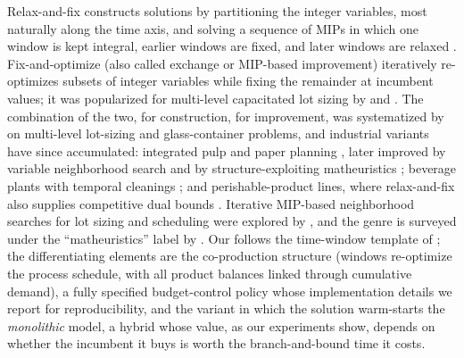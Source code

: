 Relax-and-fix constructs solutions by partitioning the integer
variables, most naturally along the time axis, and solving a
sequence of MIPs in which one window is kept integral, earlier windows
are fixed, and later windows are relaxed
\citep{dillenberger1994practical,pochet2006production}.
Fix-and-optimize (also called exchange or MIP-based improvement)
iteratively re-optimizes subsets of integer variables while fixing the
remainder at incumbent values; it was popularized for multi-level
capacitated lot sizing by \citet{sahling2009solving} and
\citet{helber2010fix}. The combination of the two, \RF{} for
construction, \FO{} for improvement, was systematized by
\citet{toledo2015relax} on multi-level lot-sizing and glass-container
problems, and industrial variants have since accumulated: integrated
pulp and paper planning \citep{santos2012integrated}, later improved
by variable neighborhood search \citep{figueira2013hybrid} and by
structure-exploiting matheuristics \citep{furlan2024matheuristic};
beverage plants with temporal cleanings \citep{toscano2020formulation};
and perishable-product lines, where relax-and-fix also supplies
competitive dual bounds \citep{jors2021perishable}. Iterative
MIP-based neighborhood searches for lot sizing and scheduling were
explored by \citet{jamesSingleParallelMachine}, and the genre is surveyed under
the ``matheuristics'' label by \citet{fischetti2018matheuristics}.
Our \RFFO{} follows the time-window template of
\citet{toledo2015relax}; the differentiating elements are the
co-production structure (windows re-optimize the process schedule,
with all product balances linked through cumulative demand), a fully
specified budget-control policy whose implementation details we report
for reproducibility, and the \RFMIP{} variant in which the \RF{}
solution warm-starts the \emph{monolithic} model, a hybrid whose
value, as our experiments show, depends on whether the incumbent it
buys is worth the branch-and-bound time it costs.

